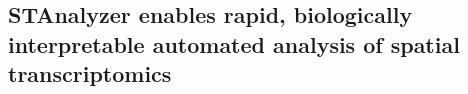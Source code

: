 \documentclass[11pt,a4paper]{article}
\begin{document}
\subsection{STAnalyzer enables rapid, biologically interpretable automated analysis of spatial transcriptomics}




\end{document}
